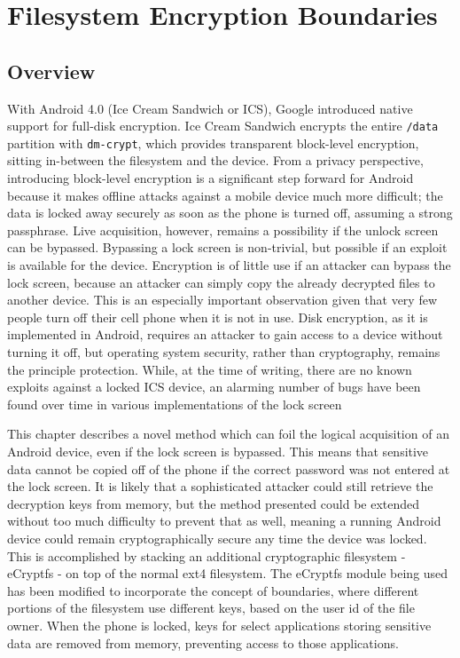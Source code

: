 \chapter{Filesystem Encryption Boundaries}
\label{ch:ecryptfs}

\section{Overview} 
With Android 4.0 (Ice Cream Sandwich or ICS), Google introduced native support for full-disk encryption. Ice Cream Sandwich encrypts
the entire \texttt{/data} partition with \texttt{dm-crypt}, which provides transparent block-level encryption, sitting in-between
the filesystem and the device. From a privacy perspective, introducing block-level encryption is a significant step forward for
Android because it makes offline attacks against a mobile device much more difficult; the data is locked away securely as soon as
the phone is turned off, assuming a strong passphrase. Live acquisition, however, remains a possibility if the unlock screen can be
bypassed.  Bypassing a lock screen is non-trivial, but possible if an exploit is available for the device. Encryption is of little
use if an attacker can bypass the lock screen, because an attacker can simply copy the already decrypted files to another device.
This is an especially important observation given that very few people turn off their cell phone when it is not in use. Disk
encryption, as it is implemented in Android, requires an attacker to gain access to a device without turning it off, but operating
system security, rather than cryptography, remains the principle protection. While, at the time of writing, there are no known
exploits against a locked ICS device, an alarming number of bugs have been found over time in various implementations of the lock
screen \cite{hoog, lockscreenbypass0, lockscreenbypass1, lockscreenbypass2}

This chapter describes a novel method which can foil the logical acquisition of an Android device, even if the lock screen is
bypassed. This means that sensitive data cannot be copied off of the phone if the correct password was not entered at the lock
screen. It is likely that a sophisticated attacker could still retrieve the decryption keys from memory, but the method presented
could be extended without too much difficulty to prevent that as well, meaning a running Android device could remain
cryptographically secure any time the device was locked. This is accomplished by stacking an additional cryptographic filesystem -
eCryptfs - on top of the normal ext4 filesystem. The eCryptfs module being used has been modified to incorporate the concept of
boundaries, where different portions of the filesystem use different keys, based on the user id of the file owner. When the phone
is locked, keys for select applications storing sensitive data are removed from memory, preventing access to those applications.

